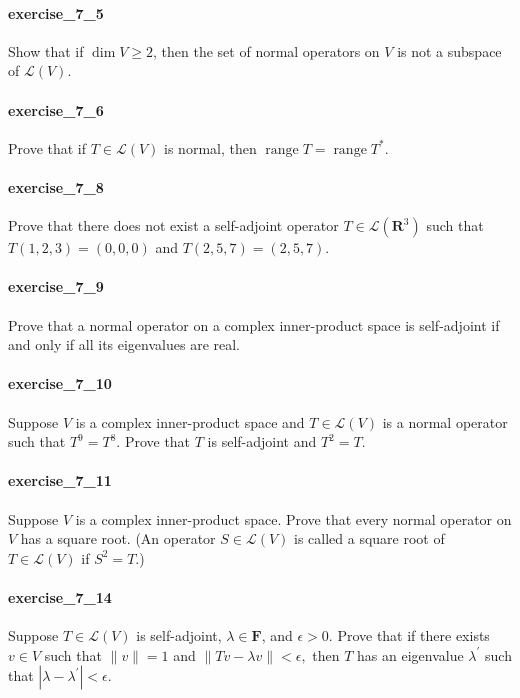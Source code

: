 \documentclass{article}
\begin{document}
\paragraph{exercise\_7\_5} Show that if $\operatorname{dim} V \geq 2$, then the set of normal operators on $V$ is not a subspace of $\mathcal{L}(V)$.

\paragraph{exercise\_7\_6} Prove that if $T \in \mathcal{L}(V)$ is normal, then $\operatorname{range} T=\operatorname{range} T^{*}.$

\paragraph{exercise\_7\_8} Prove that there does not exist a self-adjoint operator $T \in \mathcal{L}\left(\mathbf{R}^{3}\right)$ such that $T(1,2,3)=(0,0,0)$ and $T(2,5,7)=(2,5,7)$.

\paragraph{exercise\_7\_9} Prove that a normal operator on a complex inner-product space is self-adjoint if and only if all its eigenvalues are real.

\paragraph{exercise\_7\_10} Suppose $V$ is a complex inner-product space and $T \in \mathcal{L}(V)$ is a normal operator such that $T^{9}=T^{8}$. Prove that $T$ is self-adjoint and $T^{2}=T$.

\paragraph{exercise\_7\_11} Suppose $V$ is a complex inner-product space. Prove that every normal operator on $V$ has a square root. (An operator $S \in \mathcal{L}(V)$ is called a square root of $T \in \mathcal{L}(V)$ if $S^{2}=T$.)

\paragraph{exercise\_7\_14} Suppose $T \in \mathcal{L}(V)$ is self-adjoint, $\lambda \in \mathbf{F}$, and $\epsilon>0$. Prove that if there exists $v \in V$ such that $\|v\|=1$ and $\|T v-\lambda v\|<\epsilon,$ then $T$ has an eigenvalue $\lambda^{\prime}$ such that $\left|\lambda-\lambda^{\prime}\right|<\epsilon$.
\end{document}
